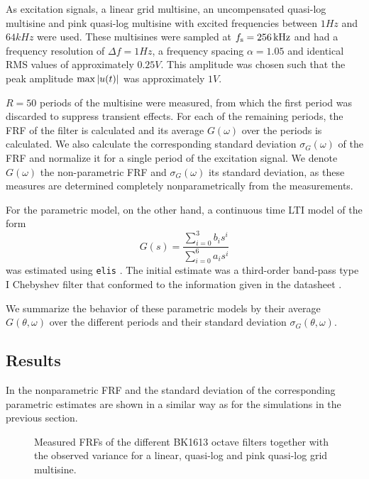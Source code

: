     As excitation signals, a linear grid multisine, an uncompensated quasi-log multisine and pink quasi-log multisine with excited frequencies between $1 \unit{Hz}$ and $64 \unit{kHz}$ were used.
    These multisines were sampled at $f_{\mathrm{s}} = 256\,\mathrm{kHz}$ and had a frequency resolution of $\Delta f = 1 \unit{Hz}$, a frequency spacing $\alpha = 1.05$ and identical RMS values of approximately $0.25 \unit{V}$.
    This amplitude was chosen such that the peak amplitude $\max \left| u(t) \right|$ was approximately $1 \unit{V}$.

    $R=50$ periods of the multisine were measured, from which the first period was discarded to suppress transient effects.
    For each of the remaining periods, the FRF of the filter is calculated and its average $G\left(\omega \right)$ over the periods is calculated.
    We also calculate the corresponding standard deviation $\sigma_G\left( \omega \right)$ of the FRF and normalize it for a single period of the excitation signal.
    We denote $G\left(\omega \right)$ the non-parametric FRF and $\sigma_G\left( \omega \right)$ its standard deviation, as these measures are determined completely nonparametrically from the measurements.

    For the parametric model, on the other hand, a continuous time \gls{LTI} model of the form
    \begin{equation}
      G(s) = \frac{\sum_{i=0}^3 b_i s^i}{\sum_{i=0}^6 a_i s^i}
    \end{equation}
    was estimated using \texttt{elis} \citep{FDIDENT}.
    The initial estimate was a third-order band-pass type I Chebyshev filter \citep{Zverev1967} that conformed to the information given in the datasheet \citep{datasheet_bk1613}.

    We summarize the behavior of these parametric models by their average $G\left(\theta,\omega \right)$ over the different periods and their standard deviation $\sigma_G\left(\theta,\omega \right)$.

    \subsection{Results}
    In  the nonparametric FRF and the standard deviation of the corresponding parametric estimates are shown in a similar way as for the simulations in the previous section.

    \begin{figure}%
    \centering
      \setlength{}
      \setlength\figureheight{0.68\figurewidth}
    
    \caption[Measured FRFs of all BK1613 octave filters and their variance for different excitation signals.]{Measured FRFs of the different \bruelkjaer BK1613 octave filters together with the observed variance for a linear, quasi-log and pink quasi-log grid multisine.}%
      \label{fig:measurements}
    \end{figure}


